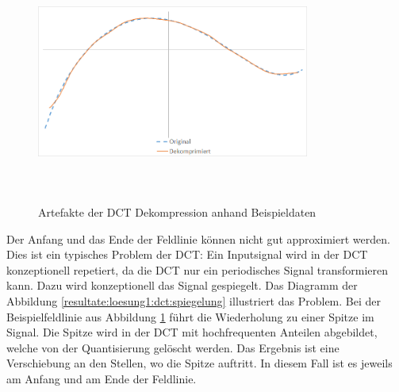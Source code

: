 \begin{figure}[!htbp]
	\center
	\includegraphics[width=0.8\textwidth,height=8cm,keepaspectratio]{./pictures/resultate/loesung1/loesung1-0/loesung1_0_artefakte.png}
	\caption{Artefakte der DCT Dekompression anhand Beispieldaten}
	\label{resultate:loesung1:dct:artefakte}
\end{figure}
Der Anfang und das Ende der Feldlinie können nicht gut approximiert werden. Dies ist ein typisches Problem der DCT: Ein Inputsignal wird in der DCT konzeptionell repetiert, da die DCT nur ein periodisches Signal transformieren kann. Dazu wird konzeptionell das Signal gespiegelt. Das Diagramm der Abbildung \ref{resultate:loesung1:dct:spiegelung} illustriert das Problem. Bei der Beispielfeldlinie aus Abbildung \ref{resultate:loesung1:dct:artefakte} führt die Wiederholung zu einer Spitze im Signal. Die Spitze wird in der DCT mit hochfrequenten Anteilen abgebildet, welche von der Quantisierung gelöscht werden. Das Ergebnis ist eine Verschiebung an den Stellen, wo die Spitze auftritt. In diesem Fall ist es jeweils am Anfang und am Ende der Feldlinie.

